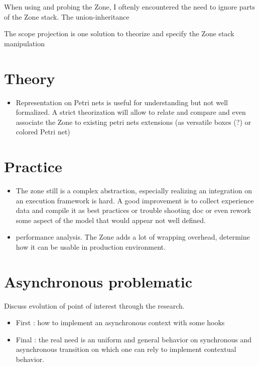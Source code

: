 When using and probing the Zone, I oftenly encountered the need to ignore parts of the Zone stack. The union-inheritance

The scope projection is one solution to theorize and specify the Zone stack manipulation


\section{Theory}

\begin{itemize}
\item Representation on Petri nets is useful for understanding but not well formalized. A strict theorization will allow to relate and compare and even associate the Zone to existing petri nets extensions (as versatile boxes (?) or colored Petri net)
\end{itemize}

\section{Practice}

\begin{itemize}
\item The zone still is a complex abstraction, especially realizing an integration on an execution framework is hard. A good improvement is to collect experience data and compile it as best practices or trouble shooting doc or even rework some aspect of the model that would appear not well defined.
\item performance analysis. The Zone adds a lot of wrapping overhead, determine how it can be usable in production environment.
\end{itemize}


\section{Asynchronous problematic}

Discuss evolution of point of interest through the research.

\begin{itemize}
\item First : how to implement an asynchronous context with some hooks
\item Final : the real need is an uniform and general behavior on synchronous and asynchronous transition on which one can rely to implement contextual behavior.
\end{itemize}